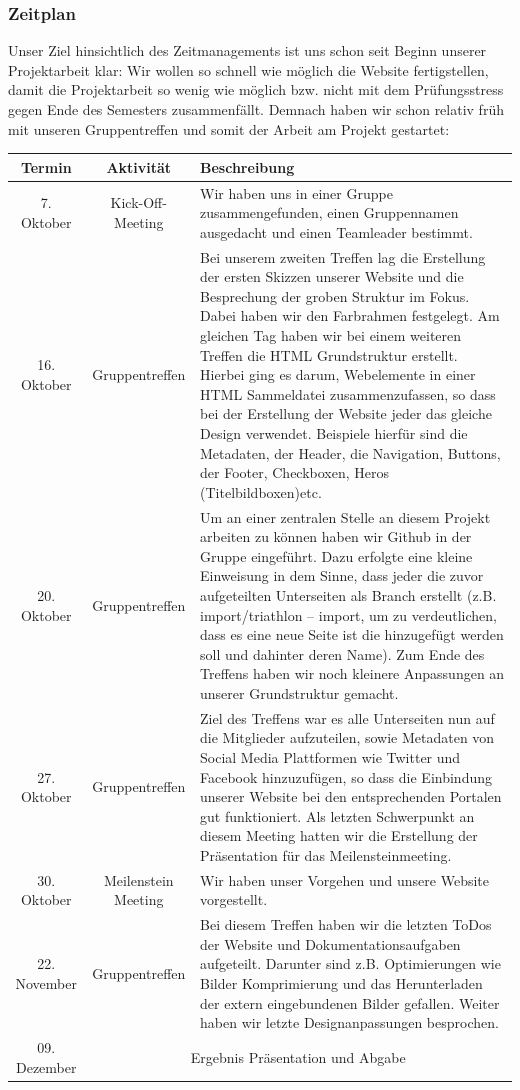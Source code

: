 \documentclass[12pt,a4paper]{article}
\begin{document}
\subsubsection{Zeitplan}
Unser Ziel hinsichtlich des Zeitmanagements ist uns schon seit Beginn unserer Projektarbeit klar: 
Wir wollen so schnell wie möglich die Website fertigstellen, damit die Projektarbeit so wenig wie möglich bzw. nicht mit dem Prüfungsstress gegen Ende des Semesters zusammenfällt.
Demnach haben wir schon relativ früh mit unseren Gruppentreffen und somit der Arbeit am Projekt gestartet:\\
\begin{table}
\begin{tabular}[h]{c|c|p{9cm}}
\hline
\textbf{Termin} & \textbf{Aktivität} & \textbf{Beschreibung} \\
\hline
7. Oktober & Kick-Off-Meeting & Wir haben uns in einer Gruppe zusammengefunden, einen Gruppennamen ausgedacht und einen Teamleader bestimmt. \\
\hline
16. Oktober & Gruppentreffen & Bei unserem zweiten Treffen lag die Erstellung der ersten Skizzen unserer Website und die
Besprechung der groben Struktur im Fokus. Dabei haben wir den Farbrahmen festgelegt. Am gleichen Tag haben wir bei einem weiteren Treffen die HTML Grundstruktur erstellt. Hierbei ging es darum, Webelemente in einer HTML Sammeldatei zusammenzufassen, so dass bei der Erstellung der Website jeder das gleiche Design verwendet.  Beispiele hierfür sind die Metadaten, der Header, die Navigation, Buttons, der Footer, Checkboxen, Heros (Titelbildboxen)etc.\\
\hline
20. Oktober & Gruppentreffen & Um an einer zentralen Stelle an diesem Projekt arbeiten zu können haben wir Github in der Gruppe eingeführt. Dazu erfolgte eine kleine Einweisung in dem Sinne, dass jeder die zuvor aufgeteilten Unterseiten als Branch erstellt (z.B. import/triathlon – import, um zu verdeutlichen, dass es eine neue Seite ist die hinzugefügt werden soll und dahinter deren Name).
Zum Ende des Treffens haben wir noch kleinere Anpassungen an unserer Grundstruktur gemacht.\\
\hline
27. Oktober & Gruppentreffen & Ziel des Treffens war es alle Unterseiten nun auf die Mitglieder aufzuteilen, sowie Metadaten von Social Media Plattformen wie Twitter und Facebook hinzuzufügen, so dass die Einbindung unserer Website bei den entsprechenden Portalen gut funktioniert. Als letzten Schwerpunkt an diesem Meeting hatten wir die Erstellung der Präsentation für das Meilensteinmeeting.\\
\hline
30. Oktober & Meilenstein Meeting & Wir haben unser Vorgehen und unsere Website vorgestellt.\\
\hline
22. November & Gruppentreffen & Bei diesem Treffen haben wir die letzten ToDos der Website und Dokumentationsaufgaben aufgeteilt. Darunter sind z.B. Optimierungen wie Bilder Komprimierung und das Herunterladen der extern eingebundenen Bilder gefallen. Weiter haben wir letzte Designanpassungen besprochen. \\
\hline
09. Dezember & \multicolumn{2}{c}{Ergebnis Präsentation und Abgabe} \\
\hline


\end{tabular}
\end{table}
\end{document}

